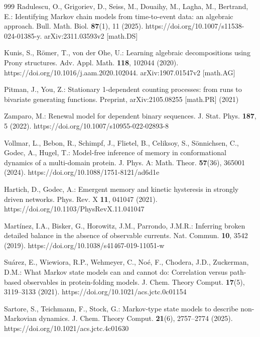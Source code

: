 \begin{thebibliography}{999}
Radulescu, O., Grigoriev, D., Seiss, M., Douaihy, M., Lagha, M., Bertrand, E.:
Identifying Markov chain models from time-to-event data: an algebraic approach.
Bull. Math. Biol. \textbf{87}(1), 11 (2025).
https://doi.org/10.1007/s11538-024-01385-y. arXiv:2311.03593v2 [math.DS]

Kunis, S., R\"omer, T., von der Ohe, U.: Learning algebraic decompositions
using Prony structures. Adv. Appl. Math. \textbf{118}, 102044 (2020).
https://doi.org/10.1016/j.aam.2020.102044. arXiv:1907.01547v2 [math.AG]

Pitman, J., You, Z.: Stationary 1-dependent counting processes: from runs to bivariate generating functions. Preprint, arXiv:2105.08255 [math.PR] (2021)

Zamparo, M.: Renewal model for dependent binary sequences. J. Stat. Phys.
\textbf{187}, 5 (2022). https://doi.org/10.1007/s10955-022-02893-8

Vollmar, L., Bebon, R., Schimpf, J., Flietel, B., Celiksoy, S., S\"onnichsen, C., Godec, A., Hugel, T.: Model-free inference of memory in conformational dynamics of a multi-domain protein. J. Phys. A: Math. Theor. \textbf{57}(36), 365001 (2024). https://doi.org/10.1088/1751-8121/ad6d1e

Hartich, D., Godec, A.: Emergent memory and kinetic hysteresis in strongly driven networks. Phys. Rev. X \textbf{11}, 041047 (2021). https://doi.org/10.1103/PhysRevX.11.041047

Mart\'inez, I.A., Bisker, G., Horowitz, J.M., Parrondo, J.M.R.: Inferring
broken detailed balance in the absence of observable currents. Nat. Commun.
\textbf{10}, 3542 (2019). https://doi.org/10.1038/s41467-019-11051-w

Su\'arez, E., Wiewiora, R.P., Wehmeyer, C., No\'e, F., Chodera, J.D., Zuckerman, D.M.: What Markov state models can and cannot do: Correlation versus path-based observables in protein-folding models. J. Chem. Theory Comput. \textbf{17}(5), 3119--3133 (2021). https://doi.org/10.1021/acs.jctc.0c01154

Sartore, S., Teichmann, F., Stock, G.: Markov-type state models to describe non-Markovian dynamics. J. Chem. Theory Comput. \textbf{21}(6), 2757--2774 (2025). https://doi.org/10.1021/acs.jctc.4c01630


\end{thebibliography}
